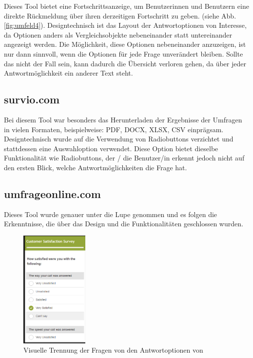Dieses Tool bietet eine Fortschrittsanzeige, um Benutzerinnen und Benutzern eine direkte Rückmeldung über ihren derzeitigen Fortschritt zu geben.
(siehe Abb. \ref{fig:umfeld4}). Designtechnisch ist das Layout der Antwortoptionen von Interesse, da Optionen anders als 
Vergleichsobjekte nebeneinander statt untereinander angezeigt werden. Die Möglichkeit, diese Optionen nebeneinander 
anzuzeigen, ist nur dann sinnvoll, wenn die Optionen für jede Frage unverändert bleiben. Sollte das nicht der Fall sein, 
kann dadurch die Übersicht verloren gehen, da über jeder Antwortmöglichkeit ein anderer Text steht. \cite{noauthor_fragebogen_nodate-5}

\subsection{survio.com}
Bei diesem Tool war besonders das Herunterladen der Ergebnisse der Umfragen in vielen Formaten, beispielweise: PDF, DOCX, 
XLSX, CSV einprägsam.
\newline
\newline
Designtechnisch wurde auf die Verwendung von Radiobuttons verzichtet und stattdessen eine 
Auswahloption verwendet. Diese Option bietet dieselbe Funktionalität wie Radiobuttons, der / die Benutzer/in erkennt jedoch nicht 
auf den ersten Blick, welche Antwortmöglichkeiten die Frage hat. \cite{noauthor_fragebogen_nodate-6}

\subsection{umfrageonline.com}
Dieses Tool wurde genauer unter die Lupe genommen und es folgen die Erkenntnisse, die über das Design und die Funktionalitäten 
geschlossen wurden.

\begin{figure}[H]
    \includegraphics[width=0.3\textwidth]{pics/umfrageonline_com2.PNG}
    \centering
    \caption{Visuelle Trennung der Fragen von den Antwortoptionen von \cite{noauthor_fragebogen_nodate-7} }
    \label{fig:umfeld5}
\end{figure}

